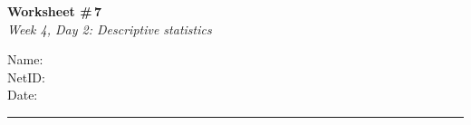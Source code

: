 \documentclass[11pt]{article}
\begin{document}
\noindent
\begin{minipage}[t]{0.55\textwidth}
  \vspace{0pt}
  {\LARGE \textbf{Worksheet \#\,7}} \\[0.3em]
  {\large \textit{Week 4, Day 2: Descriptive statistics}}
\end{minipage}
\hfill
\begin{minipage}[t]{0.40\textwidth}
  \vspace{0pt}
  \begin{mdframed}[linecolor=black, linewidth=1pt, innertopmargin=10pt, innerbottommargin=10pt]
    \small
    \vspace{0.4cm}
    Name: \underline{\hspace{4.5cm}} \\[1em]
    NetID: \underline{\hspace{4.3cm}} \\[1em]
    Date: \underline{\hspace{4.4cm}} \\
  \end{mdframed}
\end{minipage}

\vspace{1em}
\noindent\rule{\linewidth}{1pt}
\vspace{0.2em}
\end{document}
